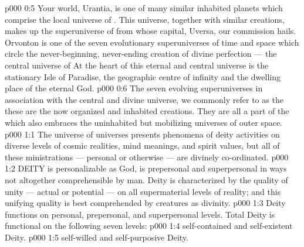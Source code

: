 \vs p000 0:5 \pc Your world, Urantia, is one of many similar inhabited planets which comprise the local universe of . This universe, together with similar creations, makes up the superuniverse of  from whose capital, Uversa, our commission hails. Orvonton is one of the seven evolutionary superuniverses of time and space which circle the never\hyp{}beginning, never\hyp{}ending creation of divine perfection --- the central universe of  At the heart of this eternal and central universe is the stationary Isle of Paradise, the geographic centre of infinity and the dwelling place of the eternal God.
\vs p000 0:6 The seven evolving superuniverses in association with the central and divine universe, we commonly refer to as the  these are the now organized and inhabited creations. They are all a part of the  which also embraces the uninhabited but mobilizing universes of outer space.
\vs p000 1:1 The universe of universes presents phenomena of deity activities on diverse levels of cosmic realities, mind meanings, and spirit values, but all of these ministrations --- personal or otherwise --- are divinely co\hyp{}ordinated.
\vs p000 1:2 \pc DEITY is personalizable as God, is prepersonal and superpersonal in ways not altogether comprehensible by man. Deity is characterized by the quality of unity --- actual or potential --- on all supermaterial levels of reality; and this unifying quality is best comprehended by creatures as divinity.
\vs p000 1:3 \pc Deity functions on personal, prepersonal, and superpersonal levels. Total Deity is functional on the following seven levels:
\vs p000 1:4 \bibnobreakspace {} self\hyp{}contained and self\hyp{}existent Deity.
\vs p000 1:5 \bibnobreakspace {} self\hyp{}willed and self\hyp{}purposive Deity.
